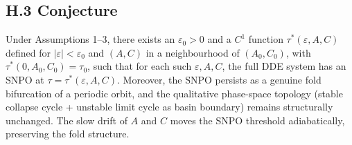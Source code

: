 \documentclass[twocolumn,10pt]{article}
\begin{document}
\subsection{H.3 Conjecture}
Under Assumptions 1–3, there exists an $\varepsilon_0 > 0$ and a $C^1$ function $\tau^*(\varepsilon, A, C)$ defined for $|\varepsilon| < \varepsilon_0$ and $(A, C)$ in a neighbourhood of $(A_0, C_0)$, with $\tau^*(0, A_0, C_0) = \tau_0$, such that for each such $\varepsilon, A, C$, the full DDE system has an SNPO at $\tau = \tau^*(\varepsilon, A, C)$. Moreover, the SNPO persists as a genuine fold bifurcation of a periodic orbit, and the qualitative phase-space topology (stable collapse cycle + unstable limit cycle as basin boundary) remains structurally unchanged. The slow drift of $A$ and $C$ moves the SNPO threshold adiabatically, preserving the fold structure.
\end{document}
